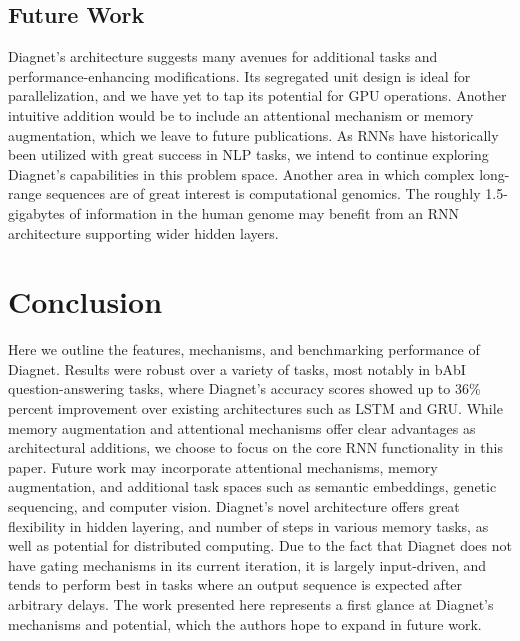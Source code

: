 \documentclass{article}
\begin{document}
\subsection{Future Work}
Diagnet's architecture suggests many avenues for additional tasks and performance-enhancing modifications.  Its segregated unit design is ideal for parallelization, and we have yet to tap its potential for GPU operations.  Another intuitive addition would be to include an attentional mechanism or memory augmentation, which we leave to future publications.  
As RNNs have historically been utilized with great success in NLP tasks, we intend to continue exploring Diagnet's capabilities in this problem space.  Another area in which complex long-range sequences are of great interest is computational genomics. The roughly 1.5-gigabytes of information in the human genome may benefit from an RNN architecture supporting wider hidden layers.  

\section{Conclusion}
Here we outline the features, mechanisms, and benchmarking performance of Diagnet. Results were robust over a variety of tasks, most notably in bAbI question-answering tasks, where Diagnet’s accuracy scores showed up to 36\% percent improvement over existing architectures such as LSTM and GRU.  While memory augmentation and attentional mechanisms offer clear advantages as architectural additions, we choose to focus on the core RNN functionality in this paper.  Future work may incorporate attentional mechanisms, memory augmentation, and additional task spaces such as semantic embeddings, genetic sequencing, and computer vision.  Diagnet’s novel architecture offers great flexibility in hidden layering, and number of steps in various memory tasks, as well as potential for distributed computing.  Due to the fact that Diagnet does not have gating mechanisms in its current iteration, it is largely input-driven, and tends to perform best in tasks where an output sequence is expected after arbitrary delays. The work presented here represents a first glance at Diagnet’s mechanisms and potential, which the authors hope to expand in future work. 
\end{document}
